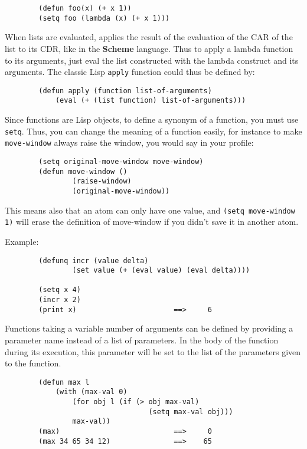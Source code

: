{\exemplefont\begin{verbatim} 
        (defun foo(x) (+ x 1))
        (setq foo (lambda (x) (+ x 1)))
\end{verbatim}}

When lists are evaluated, {\WOOL} applies the result of the evaluation of
the CAR of the list to its CDR, like in the {\bf Scheme} language. Thus to
apply a lambda function to its arguments, just eval the list constructed
with the lambda construct and its arguments. The classic Lisp {\tt apply}
function could thus be defined by:

{\exemplefont\begin{verbatim}
        (defun apply (function list-of-arguments)
            (eval (+ (list function) list-of-arguments)))
\end{verbatim}}

Since functions are Lisp objects, to define a synonym of a function, you must
use \verb"setq". Thus, you can change the meaning of a function easily, for
instance to make \verb"move-window" always raise the window, you would say
in your profile:

{\exemplefont\begin{verbatim}
        (setq original-move-window move-window)
        (defun move-window () 
                (raise-window)
                (original-move-window))
\end{verbatim}}

This means also that an atom can only have one value, and {\tt (setq
move-window 1)} will erase the definition of move-window if you didn't save
it in another atom.

Example:{\exemplefont\upspace\begin{verbatim}
        (defunq incr (value delta)
                (set value (+ (eval value) (eval delta))))

        (setq x 4)
        (incr x 2)
        (print x)                       ==>     6
\end{verbatim}}

Functions taking a variable number of arguments can be defined by
providing a parameter name instead of a list of parameters. In the
body of the function during its execution, this parameter will be set
to the list of the parameters given to the function.

{\exemplefont\begin{verbatim}
        (defun max l
            (with (max-val 0) 
                (for obj l (if (> obj max-val)
                                  (setq max-val obj)))
                max-val))
        (max)                           ==>     0
        (max 34 65 34 12)               ==>    65
\end{verbatim}}

